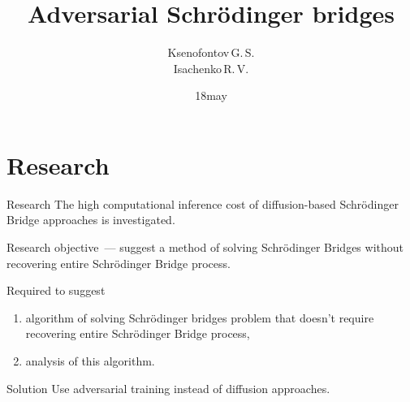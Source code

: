 \documentclass[10pt,pdf,hyperref={unicode}]{beamer}
\title[]{Adversarial Schrödinger bridges}
\author{Ksenofontov\,G.\,S.\\[1ex] 
\small Isachenko\,R.\,V.}
\institute[]{Moscow Institute of Physics and Technology}
\date[2023]{\small 18\;may\;2024}
\begin{document}
\begin{frame}
\titlepage
\end{frame}

\section{Research}
\begin{frame}{Research}
\bigskip
The high computational inference cost of diffusion-based Schrödinger Bridge approaches is investigated.
\begin{block}{Research objective~---}
suggest a method of solving Schrödinger Bridges without recovering entire Schrödinger Bridge process.
\end{block}
\begin{block}{Required to suggest}
\justifying
\begin{enumerate}[1.]
    \item algorithm of solving Schrödinger bridges problem that doesn't require recovering entire Schrödinger Bridge process,
    \item analysis of this algorithm.
\end{enumerate}
\end{block}
    \begin{block}{Solution}
        Use adversarial training instead of diffusion approaches.
    \end{block}
\end{frame}
\end{document}

